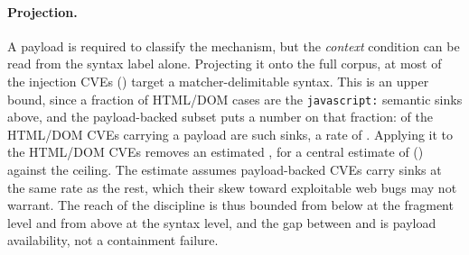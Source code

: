 \paragraph{Projection.}
A payload is required to classify the mechanism, but the \emph{context}
condition can be read from the syntax label alone.
Projecting it onto the full corpus, at most \textbf{\dataHostableCVEs} of the
\textbf{\dataInjectionCVEs} injection CVEs (\textbf{\dataHostableShare}) target a matcher-delimitable
syntax.
This is an upper bound, since a fraction of HTML/DOM cases are the
\verb|javascript:| semantic sinks above, and the payload-backed subset puts a
number on that fraction: \dataHtmlDomJsSinks of the \dataHtmlDomBacked HTML/DOM CVEs carrying a payload are
such sinks, a rate of \textbf{\dataJsSinkRate}.
Applying it to the \dataHtmlDomCVEs HTML/DOM CVEs removes an estimated \dataJsSinkRemoved, for a
central estimate of \textbf{\dataCentralEstimate} (\textbf{\dataCentralShare}) against the \dataHostableShare ceiling.
The estimate assumes payload-backed CVEs carry sinks at the same rate as the
rest, which their skew toward exploitable web bugs may not warrant.
The reach of the discipline is thus bounded from below at the fragment level and
from above at the syntax level, and the gap between \dataPayloadBackedCVEs and \dataInjectionCVEs is
payload availability, not a containment failure.
